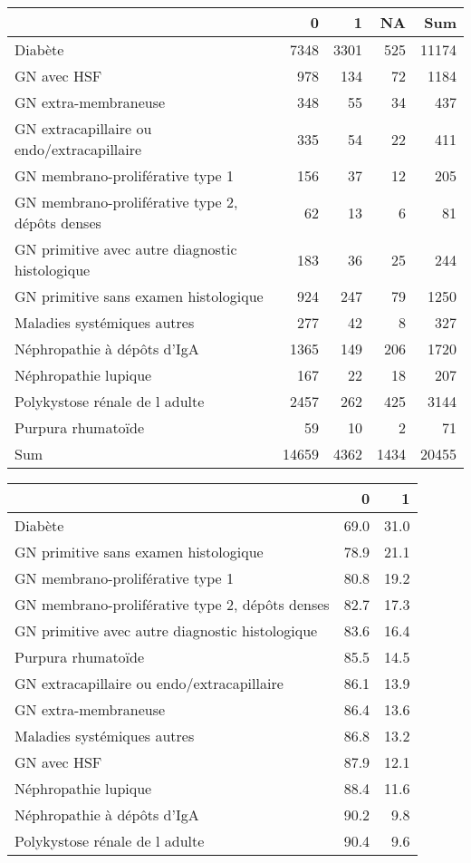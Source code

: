 \documentclass[11pt,a4paper]{article}\usepackage[]{graphicx}\usepackage[]{color}
\begin{document}
\begin{table}[H]
\centering
\begin{tabular}{lrrrr}
  \hline
 & 0 & 1 & NA & Sum \\ 
  \hline
Diabète & 7348 & 3301 & 525 & 11174 \\ 
  GN avec HSF & 978 & 134 & 72 & 1184 \\ 
  GN extra-membraneuse & 348 & 55 & 34 & 437 \\ 
  GN extracapillaire ou endo/extracapillaire & 335 & 54 & 22 & 411 \\ 
  GN membrano-proliférative type 1 & 156 & 37 & 12 & 205 \\ 
  GN membrano-proliférative type 2, dépôts denses & 62 & 13 & 6 & 81 \\ 
  GN primitive avec autre diagnostic histologique & 183 & 36 & 25 & 244 \\ 
  GN primitive sans examen histologique & 924 & 247 & 79 & 1250 \\ 
  Maladies systémiques autres & 277 & 42 & 8 & 327 \\ 
  Néphropathie à dépôts d'IgA & 1365 & 149 & 206 & 1720 \\ 
  Néphropathie lupique & 167 & 22 & 18 & 207 \\ 
  Polykystose rénale de l adulte & 2457 & 262 & 425 & 3144 \\ 
  Purpura rhumatoïde & 59 & 10 & 2 & 71 \\ 
  Sum & 14659 & 4362 & 1434 & 20455 \\ 
   \hline
\end{tabular}
\end{table}
\begin{table}[H]
\centering
\begin{tabular}{lrr}
  \hline
 & 0 & 1 \\ 
  \hline
Diabète & 69.0 & 31.0 \\ 
  GN primitive sans examen histologique & 78.9 & 21.1 \\ 
  GN membrano-proliférative type 1 & 80.8 & 19.2 \\ 
  GN membrano-proliférative type 2, dépôts denses & 82.7 & 17.3 \\ 
  GN primitive avec autre diagnostic histologique & 83.6 & 16.4 \\ 
  Purpura rhumatoïde & 85.5 & 14.5 \\ 
  GN extracapillaire ou endo/extracapillaire & 86.1 & 13.9 \\ 
  GN extra-membraneuse & 86.4 & 13.6 \\ 
  Maladies systémiques autres & 86.8 & 13.2 \\ 
  GN avec HSF & 87.9 & 12.1 \\ 
  Néphropathie lupique & 88.4 & 11.6 \\ 
  Néphropathie à dépôts d'IgA & 90.2 & 9.8 \\ 
  Polykystose rénale de l adulte & 90.4 & 9.6 \\ 
   \hline
\end{tabular}
\end{table}
\end{document}
